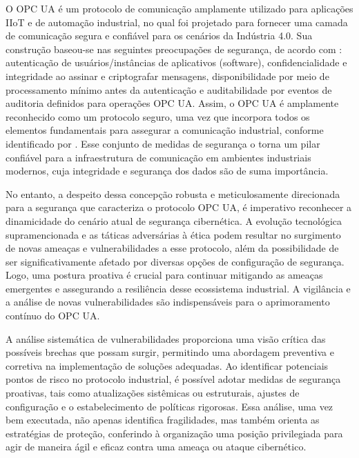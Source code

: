     O OPC UA é um protocolo de comunicação amplamente utilizado para aplicações IIoT e de automação industrial, no qual foi projetado para fornecer uma camada de comunicação segura e confiável para os cenários da Indústria 4.0. Sua construção baseou-se nas seguintes preocupações de segurança, de acordo com : autenticação de usuários/instâncias de aplicativos (software), confidencialidade e integridade ao assinar e criptografar mensagens, disponibilidade por meio de processamento mínimo antes da autenticação e auditabilidade por eventos de auditoria definidos para operações OPC UA. Assim, o OPC UA é amplamente reconhecido como um protocolo seguro, uma vez que incorpora todos os elementos fundamentais para assegurar a comunicação industrial, conforme identificado por . Esse conjunto de medidas de segurança o torna um pilar confiável para a infraestrutura de comunicação em ambientes industriais modernos, cuja integridade e segurança dos dados são de suma importância.

    No entanto, a despeito dessa concepção robusta e meticulosamente direcionada para a segurança que caracteriza o protocolo OPC UA, é imperativo reconhecer a dinamicidade do cenário atual de segurança cibernética. A evolução tecnológica supramencionada e as táticas adversárias à ética podem resultar no surgimento de novas ameaças e vulnerabilidades a esse protocolo, além da possibilidade de ser significativamente afetado por diversas opções de configuração de segurança. Logo, uma postura proativa é crucial para continuar mitigando as ameaças emergentes e assegurando a resiliência desse ecossistema industrial. A vigilância e a análise de novas vulnerabilidades são indispensáveis para o aprimoramento contínuo do OPC UA.

    A análise sistemática de vulnerabilidades proporciona uma visão crítica das possíveis brechas que possam surgir, permitindo uma abordagem preventiva e corretiva na implementação de soluções adequadas. Ao identificar potenciais pontos de risco no protocolo industrial, é possível adotar medidas de segurança proativas, tais como atualizações sistêmicas ou estruturais, ajustes de configuração e o estabelecimento de políticas rigorosas. Essa análise, uma vez bem executada, não apenas identifica fragilidades, mas também orienta as estratégias de proteção, conferindo à organização uma posição privilegiada para agir de maneira ágil e eficaz contra uma ameaça ou ataque cibernético.

